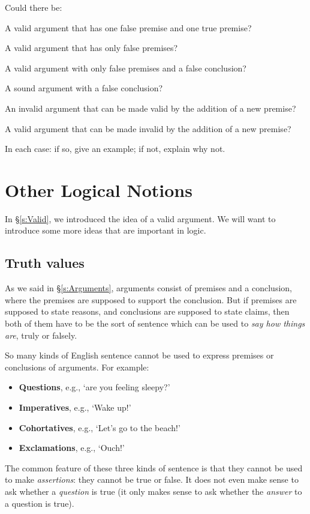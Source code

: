 \problempart
\label{pr.EnglishCombinations}
Could there be:
	\begin{earg}
		\item A valid argument that has one false premise and one true premise?
		\item A valid argument that has only false premises?
		\item A valid argument with only false premises and a false conclusion?
		\item A sound argument with a false conclusion?
		\item An invalid argument that can be made valid by the addition of a new premise?
		\item A valid argument that can be made invalid by the addition of a new premise?
	\end{earg}
In each case: if so, give an example; if not, explain why not.


\chapter{Other Logical Notions}\label{s:BasicNotions}

In §\ref{s:Valid}, we introduced the idea of a valid argument. We will want to introduce some more ideas that are important in logic.

\section{Truth values}\label{s:truthvalues}
As we said in §\ref{s:Arguments}, arguments consist of premises and a conclusion, where the premises are supposed to support the conclusion. But if premises are supposed to state reasons, and conclusions are supposed to state claims, then both of them have to be the sort of sentence which can be used to \emph{say how things are}, truly or falsely. 

So many kinds of English sentence cannot be used to express premises or conclusions of arguments. For example:
	\begin{itemize}
		\item \textbf{Questions}, e.g., `are you feeling sleepy?'
		\item \textbf{Imperatives}, e.g., `Wake up!'
		\item \textbf{Cohortatives}, e.g., `Let's go to the beach!'
		\item \textbf{Exclamations}, e.g., `Ouch!'
	\end{itemize}
The common feature of these three kinds of sentence is that they cannot be used to make \emph{assertions}: they cannot be true or false. It does not even make sense to ask whether a \emph{question} is true (it only makes sense to ask whether the \emph{answer} to a question is true).



